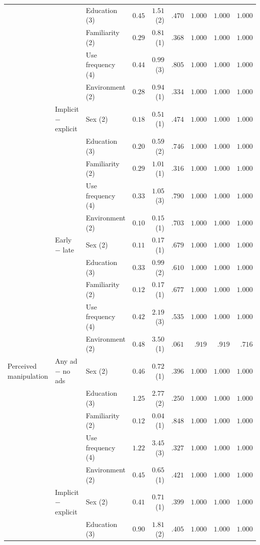 \begin{table}[H]
\begin{tabular}{@{}ll l r r r r r r@{}}
 &  & Education (3) & $0.45$ & $1.51$ (2) & $.470$ & $1.000$ & $1.000$ & $1.000$ \\
 &  & Familiarity (2) & $0.29$ & $0.81$ (1) & $.368$ & $1.000$ & $1.000$ & $1.000$ \\
 &  & Use frequency (4) & $0.44$ & $0.99$ (3) & $.805$ & $1.000$ & $1.000$ & $1.000$ \\
 &  & Environment (2) & $0.28$ & $0.94$ (1) & $.334$ & $1.000$ & $1.000$ & $1.000$ \\
 & Implicit \(-\) explicit & Sex (2) & $0.18$ & $0.51$ (1) & $.474$ & $1.000$ & $1.000$ & $1.000$ \\
 &  & Education (3) & $0.20$ & $0.59$ (2) & $.746$ & $1.000$ & $1.000$ & $1.000$ \\
 &  & Familiarity (2) & $0.29$ & $1.01$ (1) & $.316$ & $1.000$ & $1.000$ & $1.000$ \\
 &  & Use frequency (4) & $0.33$ & $1.05$ (3) & $.790$ & $1.000$ & $1.000$ & $1.000$ \\
 &  & Environment (2) & $0.10$ & $0.15$ (1) & $.703$ & $1.000$ & $1.000$ & $1.000$ \\
 & Early \(-\) late & Sex (2) & $0.11$ & $0.17$ (1) & $.679$ & $1.000$ & $1.000$ & $1.000$ \\
 &  & Education (3) & $0.33$ & $0.99$ (2) & $.610$ & $1.000$ & $1.000$ & $1.000$ \\
 &  & Familiarity (2) & $0.12$ & $0.17$ (1) & $.677$ & $1.000$ & $1.000$ & $1.000$ \\
 &  & Use frequency (4) & $0.42$ & $2.19$ (3) & $.535$ & $1.000$ & $1.000$ & $1.000$ \\
 &  & Environment (2) & $0.48$ & $3.50$ (1) & $.061$ & $.919$ & $.919$ & $.716$ \\
\midrule
Perceived manipulation & Any ad \(-\) no ads & Sex (2) & $0.46$ & $0.72$ (1) & $.396$ & $1.000$ & $1.000$ & $1.000$ \\
 &  & Education (3) & $1.25$ & $2.77$ (2) & $.250$ & $1.000$ & $1.000$ & $1.000$ \\
 &  & Familiarity (2) & $0.12$ & $0.04$ (1) & $.848$ & $1.000$ & $1.000$ & $1.000$ \\
 &  & Use frequency (4) & $1.22$ & $3.45$ (3) & $.327$ & $1.000$ & $1.000$ & $1.000$ \\
 &  & Environment (2) & $0.45$ & $0.65$ (1) & $.421$ & $1.000$ & $1.000$ & $1.000$ \\
 & Implicit \(-\) explicit & Sex (2) & $0.41$ & $0.71$ (1) & $.399$ & $1.000$ & $1.000$ & $1.000$ \\
 &  & Education (3) & $0.90$ & $1.81$ (2) & $.405$ & $1.000$ & $1.000$ & $1.000$ \\

\end{tabular}
\end{table}
